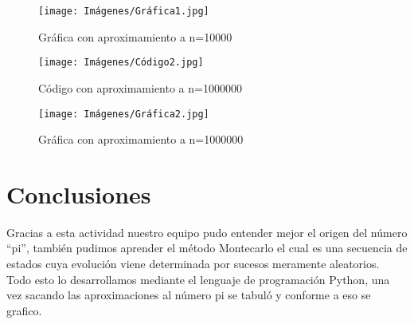 \documentclass{article}
\begin{document}
\begin{figure} [htp]%
    \centering
    \texttt{[image: Imágenes/Gráfica1.jpg]} %
    \caption{Gráfica con aproximamiento a n=10000}
    \label{grafica 1}
\end{figure}


\begin{figure} [htp]%
    \centering
    \texttt{[image: Imágenes/Código2.jpg]} %
    \caption{Código con aproximamiento a n=1000000}
    \label{grafica}
\end{figure}

\begin{figure} [htp]%
    \centering
    \texttt{[image: Imágenes/Gráfica2.jpg]} %
    \caption{Gráfica con aproximamiento a n=1000000}
    \label{grafica}
\end{figure}




\newpage
\section{Conclusiones}
Gracias a esta actividad nuestro equipo pudo entender mejor el origen del número “pi”, también pudimos aprender el método Montecarlo el cual es una secuencia de estados cuya evolución viene determinada por sucesos meramente aleatorios. Todo esto lo desarrollamos mediante el lenguaje de programación Python,  una vez sacando las aproximaciones al número pi se tabuló y conforme a eso se grafico.





\end{document}
